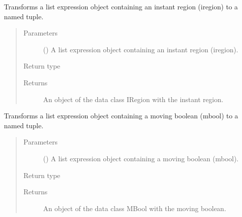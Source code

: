 \documentclass[letterpaper,10pt,english]{sphinxmanual}
\begin{document}

\begin{fulllineitems}
\label{\detokenize{index:secondodb.api.algebras.secondospatiotemporalalgebra.parse_iregion}}
Transforms a list expression object containing an instant region (iregion) to a named tuple.
\begin{quote}\begin{description}
\item[{Parameters}] \leavevmode
{} () \textendash{} A list expression object containing an instant region (iregion).

\item[{Return type}] \leavevmode
{\hyperref[\detokenize{index:secondodb.api.algebras.secondospatiotemporalalgebra.IRegion}]{}}

\item[{Returns}] \leavevmode
An object of the data class IRegion with the instant region.

\end{description}\end{quote}

\end{fulllineitems}


\begin{fulllineitems}
\label{\detokenize{index:secondodb.api.algebras.secondospatiotemporalalgebra.parse_mbool}}
Transforms a list expression object containing a moving boolean (mbool) to a named tuple.
\begin{quote}\begin{description}
\item[{Parameters}] \leavevmode
{} () \textendash{} A list expression object containing a moving boolean (mbool).

\item[{Return type}] \leavevmode
{\hyperref[\detokenize{index:secondodb.api.algebras.secondospatiotemporalalgebra.MBool}]{}}

\item[{Returns}] \leavevmode
An object of the data class MBool with the moving boolean.

\end{description}\end{quote}

\end{fulllineitems}
\end{document}
